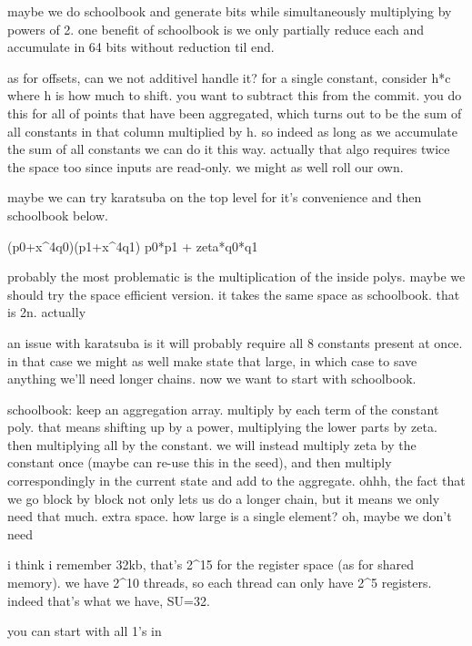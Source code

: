 maybe we do schoolbook and generate bits while simultaneously multiplying by powers of 2. 
one benefit of schoolbook is we only partially reduce each and accumulate in 64 bits without reduction til end. 

as for offsets, can we not additivel handle it?
for a single constant, consider h*c where h is how much to shift. you want to subtract this from the commit. you do this for all of points that have been aggregated, which turns out to be the sum of all constants in that column multiplied by h. so indeed as long as we accumulate the sum of all constants we can do it this way. 
actually that algo requires twice the space too since inputs are read-only. we might as well roll our own.

maybe we can try karatsuba on the top level for it's convenience and then schoolbook below.

(p0+x^4q0)(p1+x^4q1)
p0*p1 + zeta*q0*q1

probably the most problematic is the multiplication of the inside polys. 
maybe we should try the space efficient version. it takes the same space as schoolbook. that is 2n.
actually 

an issue with karatsuba is it will probably require all 8 constants present at once. in that case we might as well make state that large, in which case to save anything we'll need longer chains.
now we want to start with schoolbook.

schoolbook:
keep an aggregation array.
multiply by each term of the constant poly.
that means shifting up by a power, multiplying the lower parts by zeta. then multiplying all by the constant.
we will instead multiply zeta by the constant once (maybe can re-use this in the seed), and then multiply correspondingly in the current state and add to the aggregate.
ohhh, the fact that we go block by block not only lets us do a longer chain, but it means we only need that much. extra space. 
how large is a single element? 
oh, maybe we don't need

i think i remember 32kb, that's 2^15 for the register space (as for shared memory).
we have 2^10 threads, so each thread can only have 2^5 registers. indeed that's what we have, SU=32.



you can start with all 1's in 

